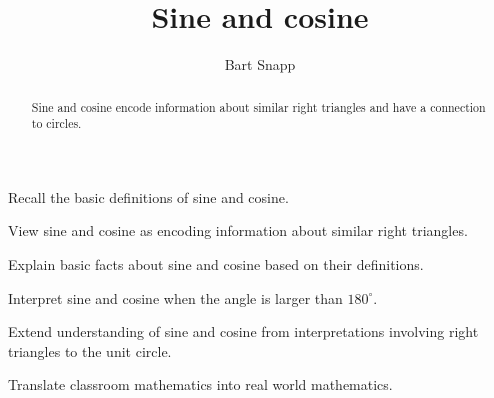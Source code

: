 \documentclass[noauthor,nooutcomes,hints,handout]{ximera}
\title{Sine and cosine}
\author{Bart Snapp}
\begin{document}
\begin{abstract}
  Sine and cosine encode information about similar right triangles and
  have a connection to circles.
\end{abstract}
\maketitle

\begin{listOutcomes}
\item Recall the basic definitions of sine and cosine.
\item View sine and cosine as encoding information about similar right
  triangles.
\item Explain basic facts about sine and cosine based on their
  definitions.
\item Interpret sine and cosine when the angle is larger than $180^\circ$.
\item Extend understanding of sine and cosine from interpretations
  involving right triangles to the unit circle.
\item Translate classroom mathematics into real world mathematics.
\end{listOutcomes}
\mynewpage
\end{document}
